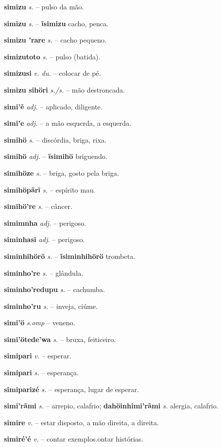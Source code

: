 \textbf{simizu} \textit{s.} -- pulso da mão.

\textbf{simizu} \textit{s.} -- \textbf{ĩsimizu} cacho, penca.

\textbf{simizu 'rare} \textit{s.} -- cacho pequeno.

\textbf{simizutoto} \textit{s.} -- pulso (batida).

\textbf{simizusi} \textit{v. du.} -- colocar de pé.

\textbf{simizu sihöri} \textit{s./s.} -- mão destroncada.

\textbf{simi'ẽ} \textit{adj.} -- aplicado, diligente.

\textbf{simi'e} \textit{adj.} -- a mão esquerda, a esquerda.

\textbf{simihö} \textit{s.} -- discórdia, briga, rixa.

\textbf{simihö} \textit{adj.} -- \textbf{ĩsimihö} briguendo.

\textbf{simihöze} \textit{s.} -- briga, gosto pela briga.

\textbf{simihöpãrĩ} \textit{s.} -- espírito mau.

\textbf{simihö're} \textit{s.} -- câncer.

\textbf{simimnha} \textit{adj.} -- perigoso.

\textbf{siminhasi} \textit{adj.} -- perigoso.

\textbf{siminhihörö} \textit{s.} -- \textbf{ĩsiminhihörö} trombeta.

\textbf{siminho're} \textit{s.} -- glândula.

\textbf{siminho'redupu} \textit{s.} -- cachumba.

\textbf{siminho'ru} \textit{s.} -- inveja, ciúme.

\textbf{simi'ö} \textit{s.omp} -- veneno.

\textbf{simi'ötede'wa} \textit{s.} -- bruxa, feiticeiro.

\textbf{simipari} \textit{v.} -- esperar.

\textbf{simipari} \textit{s.} -- esperança.

\textbf{simiparizé} \textit{s.} -- esperança, lugar de esperar.

\textbf{simi'rãmi} \textit{s.} -- arrepio, calafrio; \textbf{dahöinhimi'rãmi} \textit{s.} alergia, calafrio.

\textbf{simire} \textit{v.} -- estar disposto, a mão direita, a direita.

\textbf{simiré'é} \textit{v.} -- contar exemplos.ontar histórias.

